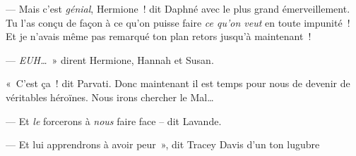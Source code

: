 --- Mais c'est \emph{génial}, Hermione~! dit Daphné avec le plus grand émerveillement. Tu l'as conçu de façon à ce qu'on puisse faire \emph{ce qu'on veut} en toute impunité~! Et je n'avais même pas remarqué ton plan retors jusqu'à maintenant~!

--- \emph{EUH…}~» dirent Hermione, Hannah et Susan.

«~C'est ça~! dit Parvati. Donc maintenant il est temps pour nous de devenir de véritables héroïnes. Nous irons chercher le Mal…

--- Et \emph{le} forcerons à \emph{nous} faire face -- dit Lavande.

--- Et lui apprendrons à avoir peur~», dit Tracey Davis d'un ton lugubre
